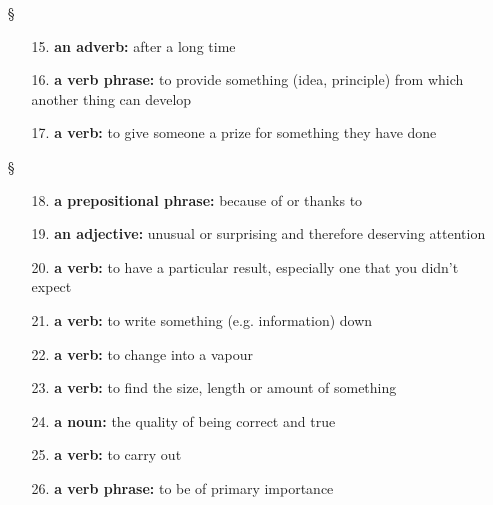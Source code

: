 \begin{enumerate}
      \item[§] 
            \begin{enumerate}
                  \item[15.] \textbf{an adverb:} after a long time
                  \item[16.] \textbf{a verb phrase:} to provide something (idea, principle) from
                        which another thing can develop
                  \item[17.] \textbf{a verb:} to give someone a prize for something they have
                        done
            \end{enumerate}
      \item[§] 
            \begin{enumerate}
                  \item[18.] \textbf{a prepositional phrase:} because of or thanks to
                  \item[19.] \textbf{an adjective:} unusual or surprising and therefore
                        deserving attention
                  \item[20.] \textbf{a verb:} to have a particular result, especially one that
                        you didn’t expect
                  \item[21.] \textbf{a verb:} to write something (e.g. information) down
                  \item[22.] \textbf{a verb:} to change into a vapour
                  \item[23.] \textbf{a verb:} to find the size, length or amount of something
                  \item[24.] \textbf{a noun:} the quality of being correct and true
                  \item[25.] \textbf{a verb:} to carry out
                  \item[26.] \textbf{a verb phrase:} to be of primary importance
            \end{enumerate}
\end{enumerate}

